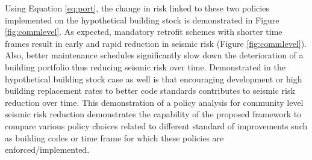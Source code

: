 
Using Equation \ref{eq:port}, the change in risk linked to these two policies implemented on the hypothetical building stock is demonstrated in Figure \ref{fig:commlevel}. As expected, mandatory retrofit schemes with shorter time frames result in early and rapid reduction in seismic risk (Figure \ref{fig:commlevel}). Also, better maintenance schedules significantly slow down the deterioration of a building portfolio thus reducing seismic risk over time. Demonstrated in the hypothetical building stock case as well is that encouraging development or high building replacement rates to better code standards contributes to seismic risk reduction over time. This demonstration of a policy analysis for community level seismic risk reduction demonstrates the capability of the proposed framework to compare various policy choices related to different standard of improvements such as building codes or time frame for which these policies are enforced/implemented.

